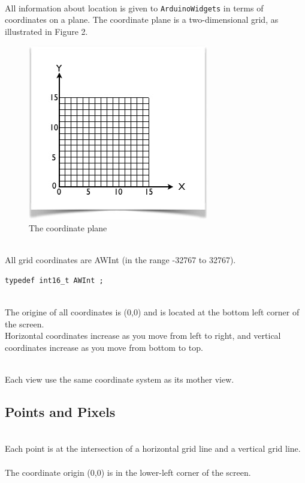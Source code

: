 \documentclass[a4paper,11pt]{extarticle}
\begin{document}
~\\ All information about location is given to \texttt{ArduinoWidgets} in terms of coordinates on a plane. The coordinate plane is a two-dimensional grid, as illustrated in Figure 2.

\begin{figure}[htbp]
   \centering
   \includegraphics[scale=1]{AWFig2.png} 
   \caption{The coordinate plane}
   \label{fig:2 }
\end{figure}

~\\All grid coordinates are AWInt (in the range -32767 to 32767).

\begin{lstlisting}[language=Arduinonl]
typedef int16_t AWInt ;
\end{lstlisting}

~\\The origine of all coordinates is (0,0) and is located at the bottom left corner of the screen.
~\\Horizontal coordinates increase as you move from left to right, and vertical coordinates increase as you move from bottom to top. 

~\\ Each view use the same coordinate system as its mother view. 


\newpage
\subsection{Points and Pixels}

~\\Each point is at the intersection of a horizontal grid line and a vertical grid line. 
~\\The coordinate origin (0,0) is in the lower-left corner of the screen. 
\end{document}
